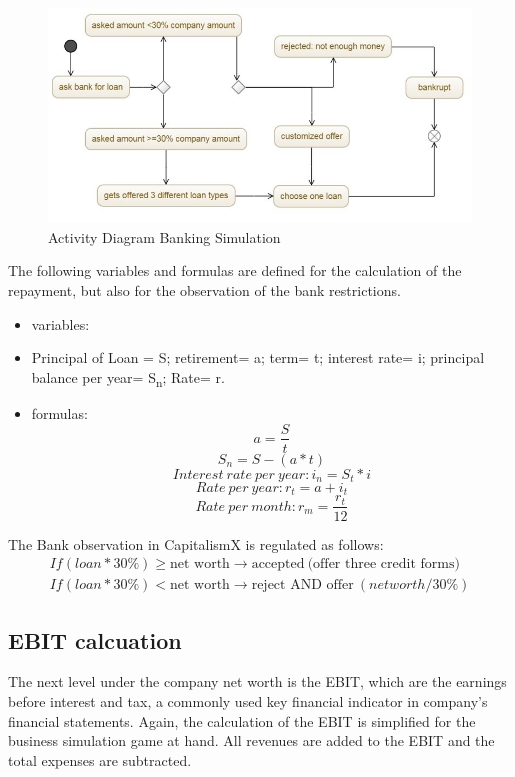 \begin{figure}
	\centering
	\includegraphics[width=12cm]{images/banking_activity_diagram.jpg}
	\caption{Activity Diagram Banking Simulation}
	\label{jpg:banking}
\end{figure}

The following variables and formulas are defined for the calculation of the repayment, but also for the observation of the bank restrictions.

\begin{itemize}
    \item variables:
    \item Principal of Loan = S; retirement= a; term= t; interest rate= i; principal balance per year= S\textsubscript{n}; Rate= r. 
    \item formulas:
 $$a={\dfrac{S}{t}}$$
 $$S_n=S-(a*t)$$
 $$Interest\ rate\ per\ year: i_n=S_t*i $$
 $$Rate\ per\ year: r_t=a+i_t$$
$$Rate\ per\ month:r_m= {\dfrac{r_t}{12}} $$
    
\end{itemize}

The Bank observation in CapitalismX is regulated as follows:
\begin{equation}
\begin{aligned}
    If (loan * 30\% ) \geq  \text{net worth} \xrightarrow{} \text{accepted} \ \text{(offer three credit forms)} \\
    If (loan * 30\%) < \text{net worth} \xrightarrow{} \text{reject AND offer} \ (net worth / 30\%)
\end{aligned}    
\end{equation}


\subsection{EBIT calcuation}
The next level under the company net worth is the EBIT, which are the earnings before interest and tax, a commonly used key financial indicator in company's financial statements. \cite{lee_e_2006} Again, the calculation of the EBIT is simplified for the business simulation game at hand. All revenues are added to the EBIT and the total expenses are subtracted. 

